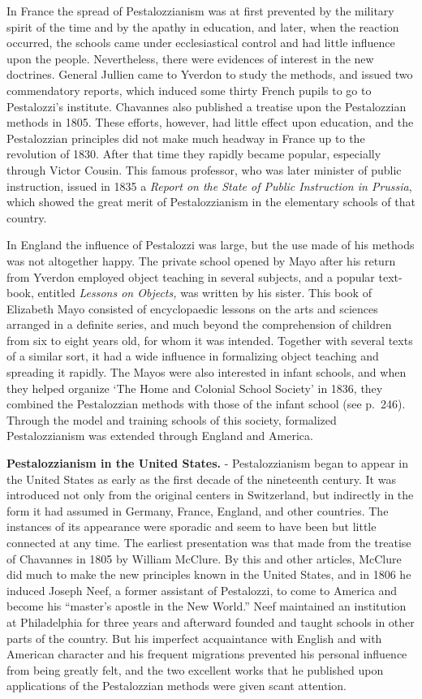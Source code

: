 \documentclass[
]{book}
\begin{document}
In France the spread of Pestalozzianism was at first prevented by the military spirit of the time and by the apathy in education, and later, when the reaction occurred, the schools came under ecclesiastical control and had little influence upon the people. Nevertheless, there were evidences of interest in the new doctrines. General Jullien came to Yverdon to study the methods, and issued two commendatory reports, which induced some thirty French pupils to go to Pestalozzi's institute. Chavannes also published a treatise upon the Pestalozzian methods in 1805. These efforts, however, had little effect upon education, and the Pestalozzian principles did not make much headway in France up to the revolution of 1830. After that time they rapidly became popular, especially through Victor Cousin. This famous professor, who was later minister of public instruction, issued in 1835 a \emph{Report on the State of Public Instruction in Prussia}, which showed the great merit of Pestalozzianism in the elementary schools of that country.

In England the influence of Pestalozzi was large, but the use made of his methods was not altogether happy. The private school opened by Mayo after his return from Yverdon employed object teaching in several subjects, and a popular text-book, entitled \emph{Lessons on Objects,} was written by his sister. This book of Elizabeth Mayo consisted of encyclopaedic lessons on the arts and sciences arranged in a definite series, and much beyond the comprehension of children from six to eight years old, for whom it was intended. Together with several texts of a similar sort, it had a wide influence in formalizing object teaching and spreading it rapidly. The Mayos were also interested in infant schools, and when they helped organize `The Home and Colonial School Society' in 1836, they combined the Pestalozzian methods with those of the infant school (see p.~246). Through the model and training schools of this society, formalized Pestalozzianism was extended through England and America.

\textbf{Pestalozzianism in the United States.} - Pestalozzianism began to appear in the United States as early as the first decade of the nineteenth century. It was introduced not only from the original centers in Switzerland, but indirectly in the form it had assumed in Germany, France, England, and other countries. The instances of its appearance were sporadic and seem to have been but little connected at any time. The earliest presentation was that made from the treatise of Chavannes in 1805 by William McClure. By this and other articles, McClure did much to make the new principles known in the United States, and in 1806 he induced Joseph Neef, a former assistant of Pestalozzi, to come to America and become his ``master's apostle in the New World.'' Neef maintained an institution at Philadelphia for three years and afterward founded and taught schools in other parts of the country. But his imperfect acquaintance with English and with American character and his frequent migrations prevented his personal influence from being greatly felt, and the two excellent works that he published upon applications of the Pestalozzian methods were given scant attention.
\end{document}
